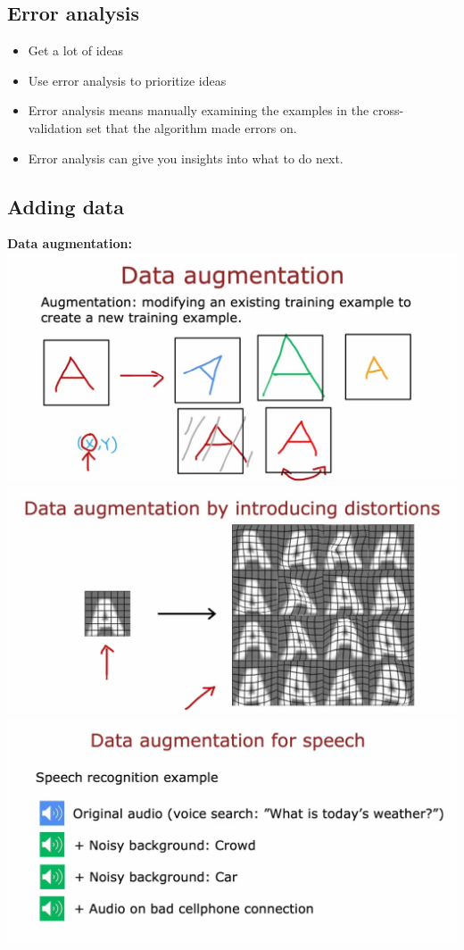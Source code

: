 \subsection*{Error analysis}
\begin{itemize}
    \item Get a lot of ideas
    \item Use error analysis to prioritize ideas
    \item Error analysis means manually examining the examples in the cross-validation set that the algorithm made errors on.
    \item Error analysis can give you insights into what to do next.
\end{itemize}
\subsection*{Adding data}
\noindent
\textbf{Data augmentation:}\\
\includegraphics*[width=\textwidth]{images/10.19}
\includegraphics*[width=\textwidth]{images/10.20}
\includegraphics*[width=\textwidth]{images/10.21}
